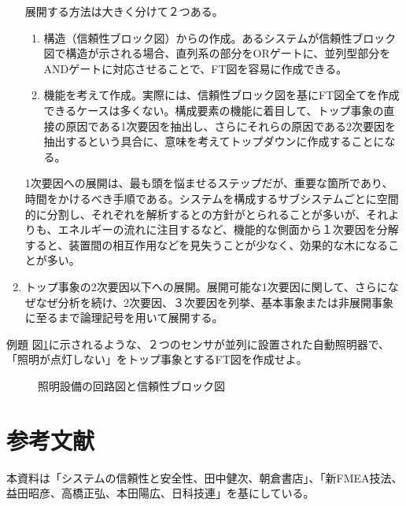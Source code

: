 \begin{enumerate}
展開する方法は大きく分けて２つある。
\begin{enumerate}
\item 構造（信頼性ブロック図）からの作成。あるシステムが信頼性ブロック図で構造が示される場合、直列系の部分をORゲートに、並列型部分をANDゲートに対応させることで、FT図を容易に作成できる。
\item 機能を考えて作成。実際には、信頼性ブロック図を基にFT図全てを作成できるケースは多くない。構成要素の機能に着目して、トップ事象の直接の原因である1次要因を抽出し、さらにそれらの原因である2次要因を抽出するという具合に、意味を考えてトップダウンに作成することになる。
\end{enumerate}
1次要因への展開は、最も頭を悩ませるステップだが、重要な箇所であり、時間をかけるべき手順である。システムを構成するサブシステムごとに空間的に分割し、それぞれを解析するとの方針がとられることが多いが、それよりも、エネルギーの流れに注目するなど、機能的な側面から１次要因を分解すると、装置間の相互作用などを見失うことが少なく、効果的な木になることが多い。
\item トップ事象の2次要因以下への展開。展開可能な1次要因に関して、さらになぜなぜ分析を続け、2次要因、３次要因を列挙、基本事象または非展開事象に至るまで論理記号を用いて展開する。
\end{enumerate}
例題 図\ref{41}に示されるような、２つのセンサが並列に設置された自動照明器で、「照明が点灯しない」をトップ事象とするFT図を作成せよ。
\begin{figure}[htbp]
\begin{center}
\end{center}
\caption{照明設備の回路図と信頼性ブロック図}
\label{41}
\end{figure}


\section*{参考文献}
本資料は「システムの信頼性と安全性、田中健次、朝倉書店」、「新FMEA技法、益田昭彦、高橋正弘、本田陽広、日科技連」を基にしている。
